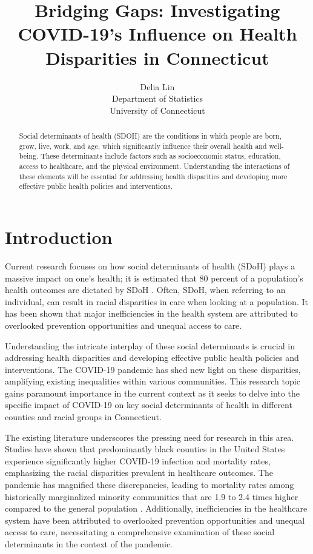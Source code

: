 \documentclass[12pt]{article}
\title{Bridging Gaps: Investigating COVID-19's Influence on Health Disparities in Connecticut}
\author{Delia Lin\\
  Department of Statistics\\
  University of Connecticut
}
\begin{document}
\maketitle


\begin{abstract}
    Social determinants of health (SDOH) are the conditions in which people are born, 
    grow, live, work, and age, which significantly influence their overall health and 
    well-being. These determinants include factors such as socioeconomic status, education, 
    access to healthcare, and the physical environment. Understanding the interactions of 
    these elements will be essential for addressing health disparities and developing more 
    effective public health policies and interventions.  
\end{abstract}

\section{Introduction}\label{sec:intro}


Current research focuses on how social determinants of health (SDoH) plays a  massive
impact on one's health; it is estimated that 80 percent of a population's health outcomes are 
dictated by SDoH \citep{HOOD2016129}. Often, SDoH, when referring to an individual, can result in racial 
disparities in care when looking at a population\citep{Monroe2023-uq}. It has been shown that major inefficiencies
in the health system are attributed to overlooked prevention opportunities and unequal access
to care.\citep{Allin2014-xn}

Understanding the intricate interplay of these social determinants is crucial in addressing health disparities 
and developing effective public health policies and interventions. The COVID-19 pandemic has shed new light on 
these disparities, amplifying existing inequalities within various communities. This research topic gains paramount 
importance in the current context as it seeks to delve into the specific impact of COVID-19 on key social determinants 
of health in different counties and racial groups in Connecticut.

The existing literature underscores the pressing need for research in this area. Studies have shown that predominantly 
black counties in the United States experience significantly higher COVID-19 infection and mortality rates, emphasizing 
the racial disparities prevalent in healthcare outcomes. The pandemic has magnified these discrepancies, leading to 
mortality rates among historically marginalized minority communities that are 1.9 to 2.4 times higher compared to the 
general population \citep{Badalov2022-wt}. Additionally, inefficiencies in the healthcare system have been attributed 
to overlooked prevention opportunities and unequal access to care, necessitating a comprehensive examination 
of these social determinants in the context of the pandemic.
\end{document}
